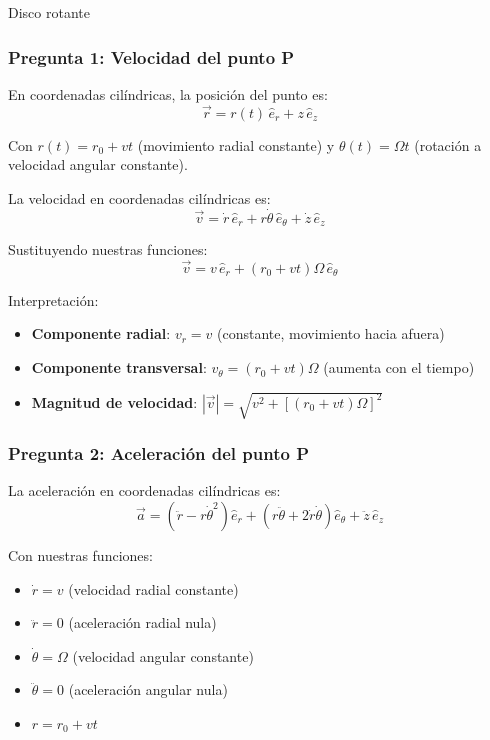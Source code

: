 \begin{solucion}{Disco rotante}
\subsubsection*{Pregunta 1: Velocidad del punto P}

En coordenadas cilíndricas, la posición del punto es:
$$\vec{r} = r(t) \, \hat{e}_r + z \, \hat{e}_z$$

Con $r(t) = r_0 + vt$ (movimiento radial constante) y $\theta(t) = \Omega t$ (rotación a velocidad angular constante).

La velocidad en coordenadas cilíndricas es:
$$\vec{v} = \dot{r} \, \hat{e}_r + r \dot{\theta} \, \hat{e}_\theta + \dot{z} \, \hat{e}_z$$

Sustituyendo nuestras funciones:
\begin{equation}
\boxed{\vec{v} = v \, \hat{e}_r + (r_0 + vt) \Omega \, \hat{e}_\theta}
\end{equation}

Interpretación:
\begin{itemize}
    \item \textbf{Componente radial}: $v_r = v$ (constante, movimiento hacia afuera)
    \item \textbf{Componente transversal}: $v_\theta = (r_0 + vt) \Omega$ (aumenta con el tiempo)
    \item \textbf{Magnitud de velocidad}: $|\vec{v}| = \sqrt{v^2 + [(r_0 + vt) \Omega]^2}$
\end{itemize}

\subsubsection*{Pregunta 2: Aceleración del punto P}

La aceleración en coordenadas cilíndricas es:
$$\vec{a} = (\ddot{r} - r\dot{\theta}^2) \hat{e}_r + (r\ddot{\theta} + 2\dot{r}\dot{\theta}) \hat{e}_\theta + \ddot{z} \, \hat{e}_z$$

Con nuestras funciones:
\begin{itemize}
    \item $\dot{r} = v$ (velocidad radial constante)
    \item $\ddot{r} = 0$ (aceleración radial nula)
    \item $\dot{\theta} = \Omega$ (velocidad angular constante)
    \item $\ddot{\theta} = 0$ (aceleración angular nula)
    \item $r = r_0 + vt$
\end{itemize}


\end{solucion}
